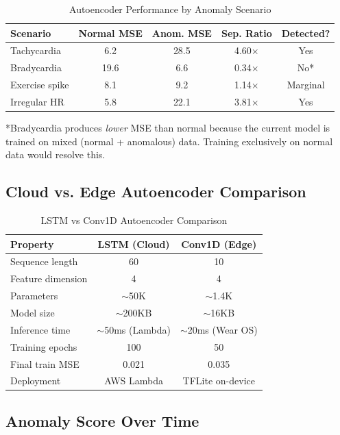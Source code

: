 \documentclass[conference]{IEEEtran}
\begin{document}
\begin{table}[H]
\centering
\caption{Autoencoder Performance by Anomaly Scenario}
\label{tab:scenarios}
\begin{tabular}{lcccc}
\toprule
\textbf{Scenario} & \textbf{Normal MSE} & \textbf{Anom. MSE} & \textbf{Sep. Ratio} & \textbf{Detected?} \\
\midrule
Tachycardia & 6.2 & 28.5 & 4.60$\times$ & Yes \\
Bradycardia & 19.6 & 6.6 & 0.34$\times$ & No* \\
Exercise spike & 8.1 & 9.2 & 1.14$\times$ & Marginal \\
Irregular HR & 5.8 & 22.1 & 3.81$\times$ & Yes \\
\bottomrule
\end{tabular}
\end{table}

*Bradycardia produces \textit{lower} MSE than normal because the current model is trained on mixed (normal + anomalous) data. Training exclusively on normal data would resolve this.

\subsection{Cloud vs. Edge Autoencoder Comparison}

\begin{table}[H]
\centering
\caption{LSTM vs Conv1D Autoencoder Comparison}
\label{tab:model_comparison}
\begin{tabular}{lcc}
\toprule
\textbf{Property} & \textbf{LSTM (Cloud)} & \textbf{Conv1D (Edge)} \\
\midrule
Sequence length & 60 & 10 \\
Feature dimension & 4 & 4 \\
Parameters & $\sim$50K & $\sim$1.4K \\
Model size & $\sim$200KB & $\sim$16KB \\
Inference time & $\sim$50ms (Lambda) & $\sim$20ms (Wear OS) \\
Training epochs & 100 & 50 \\
Final train MSE & 0.021 & 0.035 \\
Deployment & AWS Lambda & TFLite on-device \\
\bottomrule
\end{tabular}
\end{table}

\subsection{Anomaly Score Over Time}
\end{document}
